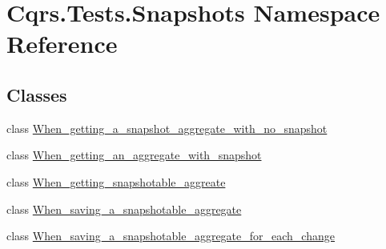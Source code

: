 \hypertarget{namespaceCqrs_1_1Tests_1_1Snapshots}{}\section{Cqrs.\+Tests.\+Snapshots Namespace Reference}
\label{namespaceCqrs_1_1Tests_1_1Snapshots}
\subsection*{Classes}
\begin{DoxyCompactItemize}
\item 
class \hyperlink{classCqrs_1_1Tests_1_1Snapshots_1_1When__getting__a__snapshot__aggregate__with__no__snapshot}{When\+\_\+getting\+\_\+a\+\_\+snapshot\+\_\+aggregate\+\_\+with\+\_\+no\+\_\+snapshot}
\item 
class \hyperlink{classCqrs_1_1Tests_1_1Snapshots_1_1When__getting__an__aggregate__with__snapshot}{When\+\_\+getting\+\_\+an\+\_\+aggregate\+\_\+with\+\_\+snapshot}
\item 
class \hyperlink{classCqrs_1_1Tests_1_1Snapshots_1_1When__getting__snapshotable__aggreate}{When\+\_\+getting\+\_\+snapshotable\+\_\+aggreate}
\item 
class \hyperlink{classCqrs_1_1Tests_1_1Snapshots_1_1When__saving__a__snapshotable__aggregate}{When\+\_\+saving\+\_\+a\+\_\+snapshotable\+\_\+aggregate}
\item 
class \hyperlink{classCqrs_1_1Tests_1_1Snapshots_1_1When__saving__a__snapshotable__aggregate__for__each__change}{When\+\_\+saving\+\_\+a\+\_\+snapshotable\+\_\+aggregate\+\_\+for\+\_\+each\+\_\+change}
\end{DoxyCompactItemize}
